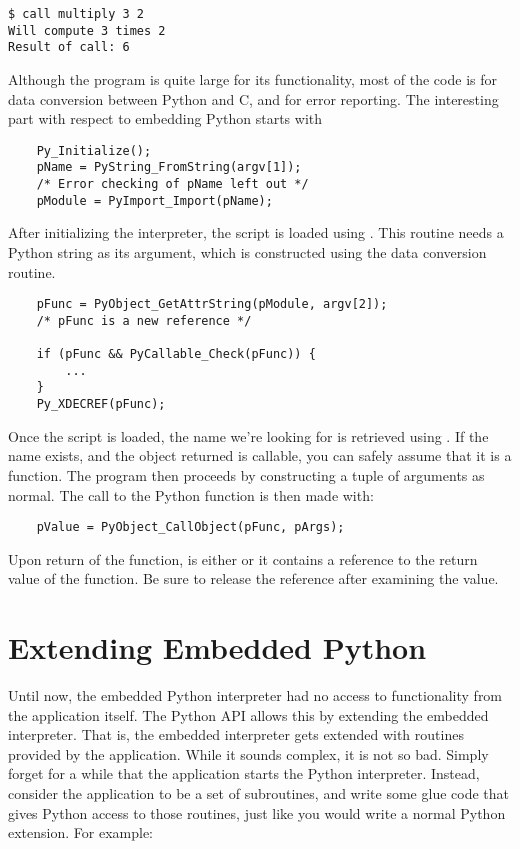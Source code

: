 \begin{verbatim}
$ call multiply 3 2
Will compute 3 times 2
Result of call: 6
\end{verbatim} %

Although the program is quite large for its functionality, most of the
code is for data conversion between Python and C, and for error
reporting.  The interesting part with respect to embedding Python
starts with

\begin{verbatim}
    Py_Initialize();
    pName = PyString_FromString(argv[1]);
    /* Error checking of pName left out */
    pModule = PyImport_Import(pName);
\end{verbatim}

After initializing the interpreter, the script is loaded using
.  This routine needs a Python string
as its argument, which is constructed using the
 data conversion routine.

\begin{verbatim}
    pFunc = PyObject_GetAttrString(pModule, argv[2]);
    /* pFunc is a new reference */

    if (pFunc && PyCallable_Check(pFunc)) {
        ...
    }
    Py_XDECREF(pFunc);
\end{verbatim}

Once the script is loaded, the name we're looking for is retrieved
using .  If the name exists, and
the object returned is callable, you can safely assume that it is a
function.  The program then proceeds by constructing a tuple of
arguments as normal.  The call to the Python function is then made
with:

\begin{verbatim}
    pValue = PyObject_CallObject(pFunc, pArgs);
\end{verbatim}

Upon return of the function,  is either \NULL{} or it
contains a reference to the return value of the function.  Be sure to
release the reference after examining the value.


\section{Extending Embedded Python
         \label{extending-with-embedding}}

Until now, the embedded Python interpreter had no access to
functionality from the application itself.  The Python API allows this
by extending the embedded interpreter.  That is, the embedded
interpreter gets extended with routines provided by the application.
While it sounds complex, it is not so bad.  Simply forget for a while
that the application starts the Python interpreter.  Instead, consider
the application to be a set of subroutines, and write some glue code
that gives Python access to those routines, just like you would write
a normal Python extension.  For example:

